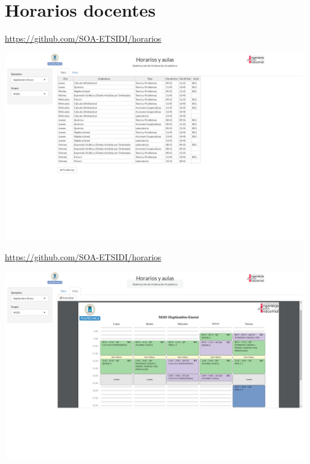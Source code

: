 \documentclass[spanish, xcolor={usenames,svgnames,dvipsnames}]{beamer}
\begin{document}
\section{Horarios docentes}
\label{sec:org6945691}

\begin{frame}[label={sec:org19a667b}]{}
\begin{block}{}
\url{https://github.com/SOA-ETSIDI/horarios}

\begin{center}
\includegraphics[width=.9\linewidth]{images/horarios.png}
\end{center}
\end{block}
\end{frame}

\begin{frame}[label={sec:orgf475314}]{}
\begin{block}{}
\url{https://github.com/SOA-ETSIDI/horarios}

\begin{center}
\includegraphics[width=.9\linewidth]{images/horarios_tt.png}
\end{center}
\end{block}
\end{frame}
\end{document}
